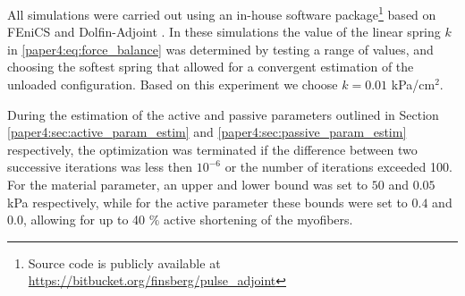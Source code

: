 All simulations were carried out using an in-house software
package\footnote{Source code is publicly available at
  \url{https://bitbucket.org/finsberg/pulse_adjoint}} 
based on FEniCS \cite{logg2012automated} and Dolfin-Adjoint \cite{farrell2013automated}.
In these simulations the value of the linear spring $k$ in
\eqref{paper4:eq:force_balance} was determined by testing a range of values,
and choosing the softest spring that allowed for a convergent
estimation of the unloaded configuration. Based on this experiment we
choose $k=0.01$ kPa/cm$^2$.

During the estimation of the active and passive parameters outlined in Section
\ref{paper4:sec:active_param_estim} and \ref{paper4:sec:passive_param_estim}
respectively, the optimization was terminated if the difference between two
successive iterations was less then $10^{-6}$ or the number of
iterations exceeded 100. For the material parameter, an upper and lower
bound was set to $50$ and $0.05$ kPa respectively, while for the active
parameter these bounds were set to $0.4$ and $0.0$, allowing for up to
40 $\%$ active shortening of the myofibers. 




